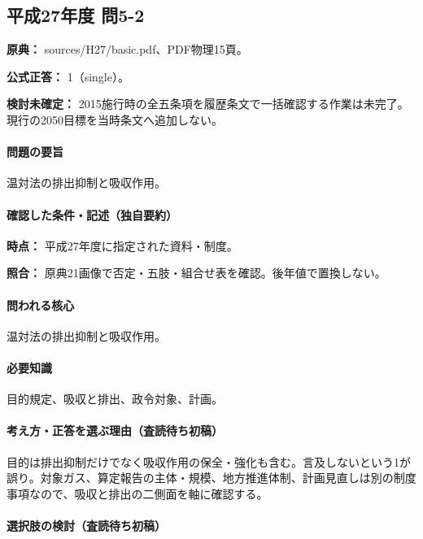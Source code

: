\subsection{平成27年度 問5-2}
\label{q:h27-reg-basic-5-2}

\noindent\textbf{原典：} sources/H27/basic.pdf、PDF物理15頁。

\textbf{公式正答：} 1（single）。

\par\textbf{検討未確定：} 2015施行時の全五条項を履歴条文で一括確認する作業は未完了。現行の2050目標を当時条文へ追加しない。

\paragraph{問題の要旨} 温対法の排出抑制と吸収作用。

\paragraph{確認した条件・記述（独自要約）}\mbox{}\par

\noindent\textbf{時点：} 平成27年度に指定された資料・制度。\par

\noindent\textbf{照合：} 原典21画像で否定・五肢・組合せ表を確認。後年値で置換しない。\par

\paragraph{問われる核心} 温対法の排出抑制と吸収作用。

\paragraph{必要知識} 目的規定、吸収と排出、政令対象、計画。

\paragraph{考え方・正答を選ぶ理由（査読待ち初稿）} 目的は排出抑制だけでなく吸収作用の保全・強化も含む。言及しないという1が誤り。対象ガス、算定報告の主体・規模、地方推進体制、計画見直しは別の制度事項なので、吸収と排出の二側面を軸に確認する。

\paragraph{選択肢の検討（査読待ち初稿）}\mbox{}\par

